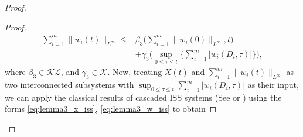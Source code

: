 \documentclass[letterpaper, 10 pt, conference]{ieeeconf}  %
\begin{document}
\begin{proof}
\begin{proof}
\begin{align}
    \sum_{i=1}^m \|w_i(t)\|_{L^\infty}  %
        \leq& \beta_3 \bigg( \sum_{i=1}^m \|w_i(0)\|_{L^\infty}, t \bigg) \nonumber \\ & + \gamma_3 \bigg( \sup_{0 \leq \tau \leq t} \bigg\{ \sum_{i=1}^m |w_i(D_i,\tau)| \bigg\} \bigg), \label{eq:lemma3_w_iss}
\end{align}
where $\beta_3 \in \mathcal{KL}$, and $\gamma_3 \in \mathcal{K}$. Now, treating $X(t)$ and $\sum_{i=1}^m \|w_i(t)\|_{L^\infty}$ as two interconnected subsystems with $\sup_{0 \leq \tau \leq t} \sum_{i=1}^m|w_i(D_i,\tau)|$ as their input, we can apply the classical results of cascaded ISS systems (See \cite[Lemme C.4]{KKK} or \cite{402246}) using the forms \eqref{eq:lemma3_x_iss}, \eqref{eq:lemma3_w_iss} to obtain 

\end{proof}
\end{proof}
\end{document}

